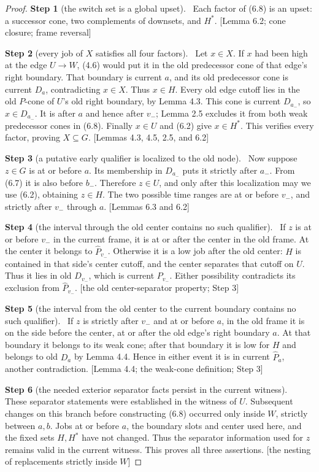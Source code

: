 \documentclass[11pt,a4paper]{article}
\theoremstyle{plain}
\theoremstyle{definition}
\newcommand{\step}[2]{\par\smallskip\noindent\textbf{Step #1} (#2).\ \ignorespaces}
\newcommand{\by}[1]{{\small[#1]}}
\begin{document}
\begin{proof}
\step{1}{the switch set is a global upset}
Each factor of (6.8) is an upset: a successor cone, two complements of downsets, and \(H^*\).
\by{Lemma 6.2; cone closure; frame reversal}

\step{2}{every job of $X$ satisfies all four factors}
Let \(x\in X\). If \(x\) had been high at the edge \(U\to W\), (4.6) would put it in the old predecessor cone of that edge's right boundary. That boundary is current \(a\), and its old predecessor cone is current \(D_a\), contradicting \(x\in X\). Thus \(x\in H\). Every old edge cutoff lies in the old \(P\)-cone of \(U\)'s old right boundary, by Lemma 4.3. This cone is current \(D_{a_-}\), so \(x\in D_{a_-}\). It is after \(a\) and hence after \(v_-\); Lemma 2.5 excludes it from both weak predecessor cones in (6.8). Finally \(x\in U\) and (6.2) give \(x\in H^*\). This verifies every factor, proving \(X\subseteq G\).
\by{Lemmas 4.3, 4.5, 2.5, and 6.2}

\step{3}{a putative early qualifier is localized to the old node}
Now suppose \(z\in G\) is at or before \(a\). Its membership in \(D_{a_-}\) puts it strictly after \(a_-\). From (6.7) it is also before \(b_-\). Therefore \(z\in U\), and only after this localization may we use (6.2), obtaining \(z\in H\). The two possible time ranges are at or before \(v_-\), and strictly after \(v_-\) through \(a\).
\by{Lemmas 6.3 and 6.2}

\step{4}{the interval through the old center contains no such qualifier}
If \(z\) is at or before \(v_-\) in the current frame, it is at or after the center in the old frame. At the center it belongs to \(\widehat P_{v_-}\). Otherwise it is a low job after the old center: \(H\) is contained in that side's center cutoff, and the center separates that cutoff on \(U\). Thus it lies in old \(D_{v_-}\), which is current \(P_{v_-}\). Either possibility contradicts its exclusion from \(\widehat P_{v_-}\).
\by{the old center-separator property; Step 3}

\step{5}{the interval from the old center to the current boundary contains no such qualifier}
If \(z\) is strictly after \(v_-\) and at or before \(a\), in the old frame it is on the side before the center, at or after the old edge's right boundary \(a\). At that boundary it belongs to its weak cone; after that boundary it is low for \(H\) and belongs to old \(D_a\) by Lemma 4.4. Hence in either event it is in current \(\widehat P_a\), another contradiction.
\by{Lemma 4.4; the weak-cone definition; Step 3}

\step{6}{the needed exterior separator facts persist in the current witness}
These separator statements were established in the witness of \(U\). Subsequent changes on this branch before constructing (6.8) occurred only inside \(W\), strictly between \(a,b\). Jobs at or before \(a\), the boundary slots and center used here, and the fixed sets \(H,H^*\) have not changed. Thus the separator information used for \(z\) remains valid in the current witness. This proves all three assertions.
\by{the nesting of replacements strictly inside $W$}
\end{proof}
\end{document}
